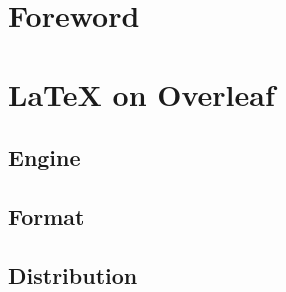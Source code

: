\tableofcontents\pagebreak
\listoffigures\pagebreak
\listoftables\pagebreak
\lstlistoflistings\pagebreak
\ClearShipoutPicture


\newpage
\printacronyms[style=glscustom]
\pagebreak


{}%
\section*{Foreword}

\label{sec:tutorial/foreword}
\newpage



\setcounter{page}{1}

\newpage
\section{\LaTeX{} on Overleaf}
\label{sec:tutorial/overleaf}


    \subsection{Engine}
    \label{sec:tutorial/overleaf/engine}
    
    
    \subsection{Format}
    \label{sec:tutorial/overleaf/format}
    

    \subsection{Distribution}
    \label{sec:tutorial/overleaf/dist}
    
    
